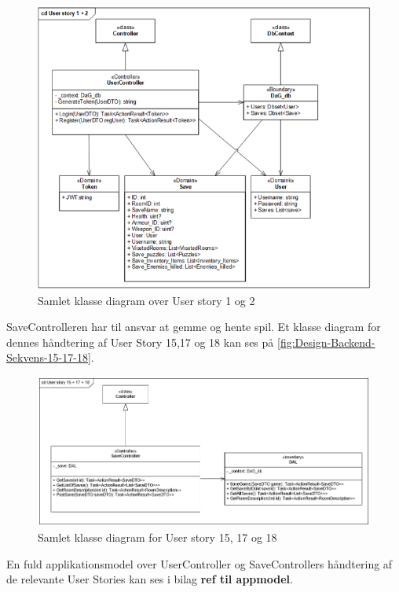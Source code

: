 \begin{figure}[H]
\centering
\includegraphics[width = \textwidth]{02-Body/Images/Backend_klasse_1_2.PNG}
\caption{Samlet klasse diagram over User story 1 og 2}
\label{fig:Design-Backend-Klasse-1-2}
\end{figure}

\noindent SaveControlleren har til ansvar at gemme og hente spil. Et klasse diagram for dennes håndtering af User Story 15,17 og 18 kan ses på \autoref{fig:Design-Backend-Sekvens-15-17-18}.\\


\begin{figure}[H]
\centering
\includegraphics[width = \textwidth]{02-Body/Images/Backend_klasse_15_17_18.PNG}
\caption{Samlet klasse diagram for User story 15, 17 og 18}
\label{fig:Design-Backend-Sekvens-15-17-18}
\end{figure}

\noindent En fuld applikationsmodel over UserController og SaveControllers håndtering af de relevante User Stories kan ses i bilag \textbf{ref til appmodel}.\\


